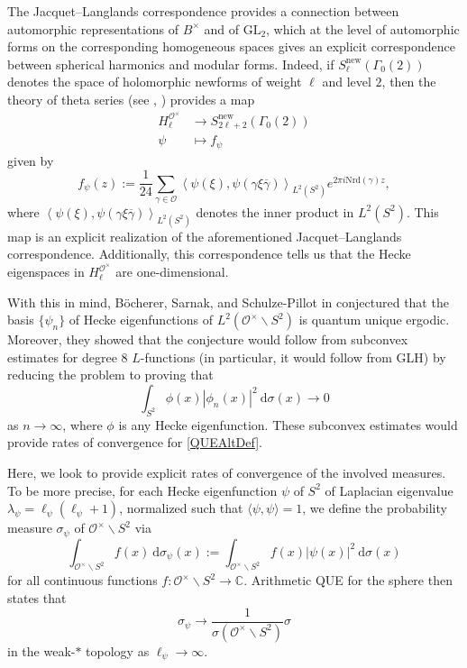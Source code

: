 \documentclass[11pt]{amsart}
\theoremstyle{definition}
\begin{document}
The Jacquet--Langlands correspondence provides a connection between automorphic representations of $B^{\times}$ and of $\mathrm{GL}_{2}$, which at the level of automorphic forms on the corresponding homogeneous spaces gives an explicit correspondence between spherical harmonics and modular forms. Indeed, if $S_{\ell}^{\text{new}}(\Gamma_0(2))$ denotes the space of holomorphic newforms of weight $\ell$ and level $2$, then the theory of theta series (see \cite[pp.~103--105]{EichlerHeckeOp}, \cite[Ch.~9,10]{Iwaniec}) provides a map
\begin{align}
    H_{\ell}^{\mathcal{O}^{\times}} &\longrightarrow S_{2\ell+2}^{\text{new}}(\Gamma_0(2)) \label{LiftSpherHarmToModForms} \\
    \psi &\longmapsto f_{\psi} \nonumber
\end{align}
given by 
\begin{equation}
    f_{\psi} (z) := \frac{1}{24}\sum_{\gamma \in \mathcal{O}} \left\langle \psi(\xi), \psi\left(\gamma \xi \overline{\gamma} \right) \right\rangle_{L^2(S^2)} e^{2\pi i \mathrm{Nrd}(\gamma) z}, \label{JLModForm}
\end{equation}
where $\left\langle \psi(\xi), \psi\left(\gamma \xi \overline{\gamma} \right) \right\rangle_{L^2(S^2)}$ denotes the inner product in $L^2(S^2)$. This map is an explicit realization of the aforementioned Jacquet--Langlands correspondence. Additionally, this correspondence tells us that the Hecke eigenspaces in $H_{\ell}^{\mathcal{O}^{\times}}$ are one-dimensional.

With this in mind, Böcherer, Sarnak, and Schulze-Pillot in \cite[Conj.~1]{BSP} conjectured that the basis $\{\psi_n\}$ of Hecke eigenfunctions of $L^2(\mathcal{O}^{\times} \backslash S^2)$ is quantum unique ergodic. Moreover, they showed that the conjecture would follow from subconvex estimates for degree $8$ $L$-functions (in particular, it would follow from GLH) by reducing the problem to proving that
\begin{equation}
    \int_{S^2} \phi(x) |\phi_n(x)|^2 \: \mathrm{d}\sigma(x) \rightarrow 0 \label{QUEAltDef}
\end{equation}
as $n\rightarrow \infty$, where $\phi$ is any Hecke eigenfunction. These subconvex estimates would provide rates of convergence for \eqref{QUEAltDef}.

Here, we look to provide explicit rates of convergence of the involved measures. To be more precise, for each Hecke eigenfunction $\psi$ of $S^2$ of Laplacian eigenvalue $\lambda_{\psi} = \ell_{\psi} (\ell_{\psi}+1)$, normalized such that $\langle \psi, \psi \rangle = 1$, we define the probability measure $\sigma_{\psi}$ of $\mathcal{O}^{\times} \backslash S^2$ via $$ \int_{\mathcal{O}^{\times} \backslash S^2} f(x) \: \mathrm{d}\sigma_{\psi}(x) := \int_{\mathcal{O}^{\times} \backslash S^2} f(x) |\psi(x)|^2 \: \mathrm{d}\sigma(x) $$ for all continuous functions $f:\mathcal{O}^{\times} \backslash S^2 \rightarrow \mathbb{C}$. Arithmetic QUE for the sphere then states that
\begin{equation}
    \sigma_{\psi} \rightarrow \frac{1}{\sigma(\mathcal{O}^{\times} \backslash S^2)}\sigma \label{QUEMeasures}
\end{equation}
in the weak-$*$ topology as $\ell_{\psi} \rightarrow \infty$. 
\end{document}
